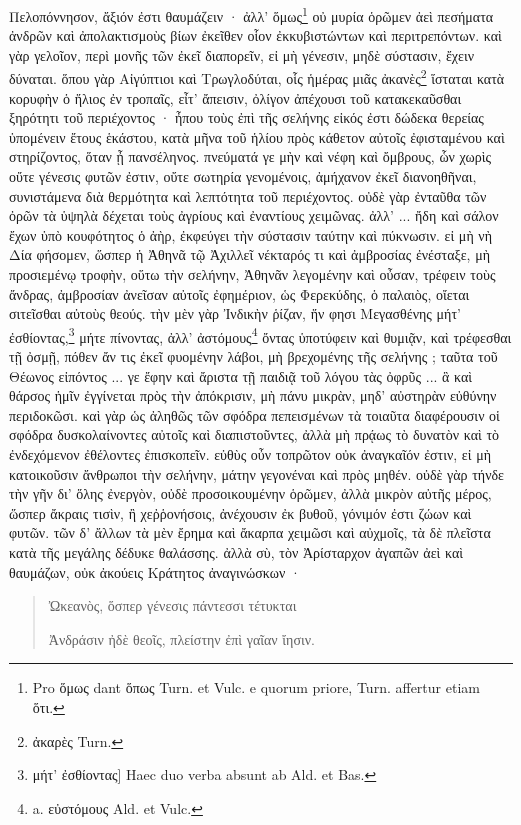 \documentclass[a4paper, 11pt, oneside, polutonikogreek, german]{article}
\begin{document}
Πελοπόννησον, ἄξιόν ἐστι θαυμάζειν · ἀλλ' ὅμως\footnote{Pro ὅμως dant ὅπως Turn. et Vulc. e quorum priore, Turn. affertur etiam ὅτι.} οὐ μυρία ὁρῶμεν ἀεὶ πεσήματα ἀνδρῶν καὶ ἀπολακτισμοὺς βίων ἐκεῖθεν οἷον ἐκκυβιστώντων καὶ περιτρεπόντων. καὶ γὰρ γελοῖον, περὶ μονῆς τῶν ἐκεῖ διαπορεῖν, εἰ μὴ γένεσιν, μηδὲ σύστασιν, ἔχειν δύναται. ὅπου γὰρ Αἰγύπτιοι καὶ Τρωγλοδύται, οἷς ἡμέρας μιᾶς ἀκανὲς\footnote{ἀκαρὲς Turn.} ἵσταται κατὰ κορυφὴν ὁ ἥλιος ἐν τροπαῖς, εἶτ' ἄπεισιν, ὀλίγον ἀπέχουσι τοῦ κατακεκαῦσθαι ξηρότητι τοῦ περιέχοντος · ἦπου τοὺς ἐπὶ τῆς σελήνης εἰκός ἐστι δώδεκα θερείας ὑπομένειν ἔτους ἑκάστου, κατὰ μῆνα τοῦ ἡλίου πρὸς κάθετον αὐτοῖς ἐφισταμένου καὶ στηρίζοντος, ὅταν ᾖ πανσέληνος. πνεύματά γε μὴν καὶ νέφη καὶ ὄμβρους, ὧν χωρὶς οὔτε γένεσις φυτῶν ἐστιν, οὔτε σωτηρία γενομένοις, ἀμήχανον ἐκεῖ διανοηθῆναι, συνιστάμενα διὰ θερμότητα καὶ λεπτότητα τοῦ περιέχοντος. οὐδὲ γὰρ ἐνταῦθα τῶν ὀρῶν τὰ ὑψηλὰ δέχεται τοὺς ἀγρίους καὶ ἐναντίους χειμῶνας. ἀλλ' ... ἤδη καὶ σάλον ἔχων ὑπὸ κουφότητος ὁ ἀὴρ, ἐκφεύγει τὴν σύστασιν ταύτην καὶ πύκνωσιν. εἰ μὴ νὴ Δία φήσομεν, ὥσπερ ἡ Ἀθηνᾶ τῷ Ἀχιλλεῖ νέκταρός τι καὶ ἀμβροσίας ἐνέσταξε, μὴ προσιεμένῳ τροφὴν, οὕτω τὴν σελήνην, Ἀθηνᾶν λεγομένην καὶ οὖσαν, τρέφειν τοὺς ἄνδρας, ἀμβροσίαν ἀνεῖσαν αὐτοῖς ἐφημέριον, ὡς Φερεκύδης, ὁ παλαιὸς, οἴεται σιτεῖσθαι αὐτοὺς θεούς. τὴν μὲν γὰρ Ἰνδικὴν ῥίζαν, ἥν φησι Μεγασθένης μήτ' ἐσθίοντας,\footnote{μήτ' ἐσθίοντας] Haec duo verba absunt ab Ald. et Bas.} μήτε πίνοντας, ἀλλ' ἀστόμους\footnote{a. εὐστόμους Ald. et Vulc.} ὄντας ὑποτύφειν καὶ θυμιᾷν, καὶ τρέφεσθαι τῇ ὀσμῇ, πόθεν ἄν τις ἐκεῖ φυομένην λάβοι, μὴ βρεχομένης τῆς σελήνης ; ταῦτα τοῦ Θέωνος εἰπόντος ... γε ἔφην καὶ ἄριστα τῇ παιδιᾷ τοῦ λόγου τὰς ὀφρῦς ... ἃ καὶ θάρσος ἡμῖν ἐγγίνεται πρὸς τὴν ἀπόκρισιν, μὴ πάνυ μικρὰν, μηδ' αὐστηρὰν εὐθύνην περιδοκῶσι. καὶ γὰρ ὡς ἀληθῶς τῶν σφόδρα πεπεισμένων τὰ τοιαῦτα διαφέρουσιν οἱ σφόδρα δυσκολαίνοντες αὐτοῖς καὶ διαπιστοῦντες, ἀλλὰ μὴ πρᾴως τὸ δυνατὸν καὶ τὸ ἐνδεχόμενον ἐθέλοντες ἐπισκοπεῖν. εὐθὺς οὖν τοπρῶτον οὐκ ἀναγκαῖόν ἐστιν, εἰ μὴ κατοικοῦσιν ἄνθρωποι τὴν σελήνην, μάτην γεγονέναι καὶ πρὸς μηθέν. οὐδὲ γὰρ τήνδε τὴν γῆν δι' ὅλης ἐνεργὸν, οὐδὲ προσοικουμένην ὁρῶμεν, ἀλλὰ μικρὸν αὐτῆς μέρος, ὥσπερ ἄκραις τισὶν, ἢ χεῤῥονήσοις, ἀνέχουσιν ἐκ βυθοῦ, γόνιμόν ἐστι ζώων καὶ φυτῶν. τῶν δ' ἄλλων τὰ μὲν ἔρημα καὶ ἄκαρπα χειμῶσι καὶ αὐχμοῖς, τὰ δὲ πλεῖστα κατὰ τῆς μεγάλης δέδυκε θαλάσσης. ἀλλὰ σὺ, τὸν Ἀρίσταρχον ἀγαπῶν ἀεὶ καὶ θαυμάζων, οὐκ ἀκούεις Κράτητος ἀναγινώσκων ·
\begin{quotation}\small
Ὠκεανὸς, ὅσπερ γένεσις πάντεσσι τέτυκται

Ἀνδράσιν ἠδὲ θεοῖς, πλείστην ἐπὶ γαῖαν ἴησιν.
\end{quotation}
\end{document}
